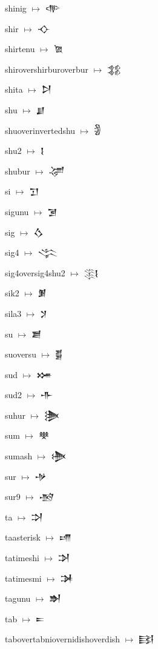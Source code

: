 {\noindent shinig $\mapsto$ {\cufont 𒋒}\par
\noindent shir $\mapsto$ {\cufont 𒋓}\par
\noindent shirtenu $\mapsto$ {\cufont 𒋔}\par
\noindent shirovershirburoverbur $\mapsto$ {\cufont 𒋕}\par
\noindent shita $\mapsto$ {\cufont 𒋖}\par
\noindent shu $\mapsto$ {\cufont 𒋗}\par
\noindent shuoverinvertedshu $\mapsto$ {\cufont 𒋘}\par
\noindent shu2 $\mapsto$ {\cufont 𒋙}\par
\noindent shubur $\mapsto$ {\cufont 𒋚}\par
\noindent si $\mapsto$ {\cufont 𒋛}\par
\noindent sigunu $\mapsto$ {\cufont 𒋜}\par
\noindent sig $\mapsto$ {\cufont 𒋝}\par
\noindent sig4 $\mapsto$ {\cufont 𒋞}\par
\noindent sig4oversig4shu2 $\mapsto$ {\cufont 𒋟}\par
\noindent sik2 $\mapsto$ {\cufont 𒋠}\par
\noindent sila3 $\mapsto$ {\cufont 𒋡}\par
\noindent su $\mapsto$ {\cufont 𒋢}\par
\noindent suoversu $\mapsto$ {\cufont 𒋣}\par
\noindent sud $\mapsto$ {\cufont 𒋤}\par
\noindent sud2 $\mapsto$ {\cufont 𒋥}\par
\noindent suhur $\mapsto$ {\cufont 𒋦}\par
\noindent sum $\mapsto$ {\cufont 𒋧}\par
\noindent sumash $\mapsto$ {\cufont 𒋨}\par
\noindent sur $\mapsto$ {\cufont 𒋩}\par
\noindent sur9 $\mapsto$ {\cufont 𒋪}\par
\noindent ta $\mapsto$ {\cufont 𒋫}\par
\noindent taasterisk $\mapsto$ {\cufont 𒋬}\par
\noindent tatimeshi $\mapsto$ {\cufont 𒋭}\par
\noindent tatimesmi $\mapsto$ {\cufont 𒋮}\par
\noindent tagunu $\mapsto$ {\cufont 𒋯}\par
\noindent tab $\mapsto$ {\cufont 𒋰}\par
\noindent tabovertabniovernidishoverdish $\mapsto$ {\cufont 𒋱}\par
}
